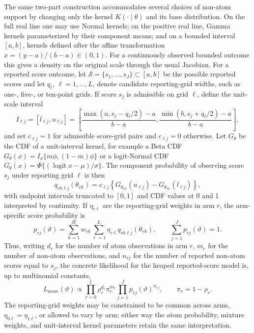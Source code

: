 \documentclass[11pt]{article}
\begin{document}
The same two-part construction accommodates several choices of non-atom support by changing only the kernel $K(\cdot\mid\theta)$ and its base distribution. On the full real line one may use Normal kernels; on the positive real line, Gamma kernels parameterized by their component means; and on a bounded interval $[a,b]$, kernels defined after the affine transformation $x=(y-a)/(b-a)\in(0,1)$. For a continuously observed bounded outcome this gives a density on the original scale through the usual Jacobian. For a reported score outcome, let $\mathcal{S}=\{s_1,\ldots,s_J\}\subset[a,b]$ be the possible reported scores and let $q_\ell$, $\ell=1,\ldots,L$, denote candidate reporting-grid widths, such as one-, five-, or ten-point grids. If score $s_j$ is admissible on grid $\ell$, define the unit-scale interval
\[
  I_{\ell j}
  =
  [l_{\ell j},u_{\ell j}]
  =
  \left[
    \frac{\max(a,s_j-q_\ell/2)-a}{b-a},
    \frac{\min(b,s_j+q_\ell/2)-a}{b-a}
  \right],
\]
and set $c_{\ell j}=1$ for admissible score-grid pairs and $c_{\ell j}=0$ otherwise. Let $G_\theta$ be the CDF of a unit-interval kernel, for example a Beta CDF $G_\theta(x)=I_x\{m\phi,(1-m)\phi\}$ or a logit-Normal CDF $G_\theta(x)=\Phi\{(\operatorname{logit}x-\mu)/\sigma\}$. The component probability of observing score $s_j$ under reporting grid $\ell$ is then
\[
  q_{rh\ell j}(\theta_{rh})
  =
  c_{\ell j}
  \left\{
    G_{\theta_{rh}}(u_{\ell j}) - G_{\theta_{rh}}(l_{\ell j})
  \right\},
\]
with endpoint intervals truncated to $[0,1]$ and CDF values at 0 and 1 interpreted by continuity. If $\eta_{r\ell}$ are the reporting-grid weights in arm $r$, the arm-specific score probability is
\[
  p_{rj}(\vartheta)
  =
  \sum_{h=1}^{H} w_{rh}
  \sum_{\ell=1}^{L}\eta_{r\ell} q_{rh\ell j}(\theta_{rh}),
  \qquad
  \sum_{j=1}^{J}p_{rj}(\vartheta)=1.
\]
Thus, writing $d_r$ for the number of atom observations in arm $r$, $m_r$ for the number of non-atom observations, and $n_{rj}$ for the number of reported non-atom scores equal to $s_j$, the concrete likelihood for the heaped reported-score model is, up to multinomial constants,
\[
  L_{\mathrm{score}}(\vartheta)
  \propto
  \prod_{r=0}^{1}
  \rho_r^{d_r}\pi_r^{m_r}
  \prod_{j=1}^{J}
  p_{rj}(\vartheta)^{n_{rj}},
  \qquad
  \pi_r=1-\rho_r.
\]
The reporting-grid weights may be constrained to be common across arms, $\eta_{0\ell}=\eta_{1\ell}$, or allowed to vary by arm; either way the atom probability, mixture weights, and unit-interval kernel parameters retain the same interpretation.
\end{document}
